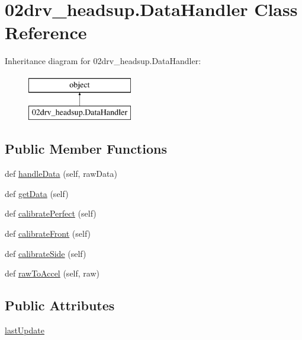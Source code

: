 \hypertarget{class02drv__headsup_1_1_data_handler}{}\section{02drv\+\_\+headsup.Data\+Handler Class Reference}
\label{class02drv__headsup_1_1_data_handler}
Inheritance diagram for 02drv\+\_\+headsup.Data\+Handler\+:\begin{figure}[H]
\begin{center}
\leavevmode
\includegraphics[height=2.000000cm]{class02drv__headsup_1_1_data_handler}
\end{center}
\end{figure}
\subsection*{Public Member Functions}
\begin{DoxyCompactItemize}
\item 
def \hyperlink{class02drv__headsup_1_1_data_handler_ae074cf4cc5d4dee4f9425470329deb50}{handle\+Data} (self, raw\+Data)
\item 
def \hyperlink{class02drv__headsup_1_1_data_handler_a7c4951265a53b46660f69286b0e8dfcd}{get\+Data} (self)
\item 
def \hyperlink{class02drv__headsup_1_1_data_handler_a631db4027bb55ef557ec03eee9bc3d8a}{calibrate\+Perfect} (self)
\item 
def \hyperlink{class02drv__headsup_1_1_data_handler_a5897c1005b216052c2153783d5318486}{calibrate\+Front} (self)
\item 
def \hyperlink{class02drv__headsup_1_1_data_handler_a7406f9ba1b547b955f71d34a77f37652}{calibrate\+Side} (self)
\item 
def \hyperlink{class02drv__headsup_1_1_data_handler_ab6e616788d8c06ef9981db8dc8c02a78}{raw\+To\+Accel} (self, raw)
\end{DoxyCompactItemize}
\subsection*{Public Attributes}
\begin{DoxyCompactItemize}
\item 
\hyperlink{class02drv__headsup_1_1_data_handler_aa5e27af3cfc7e5968bed37c476d8ca23}{last\+Update}
\end{DoxyCompactItemize}
